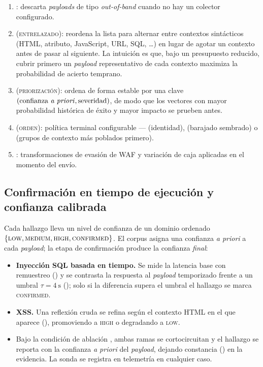 \begin{enumerate}
  \item {}: descarta \emph{payloads} de tipo
  \emph{out-of-band} cuando no hay un colector configurado.
  \item {} (\textsc{entrelazado}): reordena la
  lista para alternar entre contextos sintácticos (HTML, atributo, JavaScript,
  URL, SQL, \dots) en lugar de agotar un contexto antes de pasar al siguiente.
  La intuición es que, bajo un presupuesto reducido, cubrir primero un
  \emph{payload} representativo de cada contexto maximiza la probabilidad de
  acierto temprano.
  \item {} (\textsc{priorización}): ordena de forma estable
  por una clave $(\text{confianza \emph{a priori}}, \text{severidad})$, de
  modo que los vectores con mayor probabilidad histórica de éxito y mayor
  impacto se prueben antes.
  \item {} (\textsc{orden}): política terminal
  configurable ---  (identidad),  (barajado
  sembrado) o  (grupos de contexto más poblados primero).
  \item {}: transformaciones de evasión de WAF
  y variación de caja aplicadas en el momento del envío.
\end{enumerate}

\subsection{Confirmación en tiempo de ejecución y confianza calibrada}
\label{sec:confirmacion}

Cada hallazgo lleva un nivel de confianza de un dominio ordenado
$\{\textsc{low}, \textsc{medium}, \textsc{high}, \textsc{confirmed}\}$. El
corpus asigna una confianza \emph{a priori} a cada \emph{payload}; la etapa de
confirmación produce la confianza \emph{final}:

\begin{itemize}
  \item \textbf{Inyección SQL basada en tiempo.} Se mide la latencia base con
  remuestreo () y se contrasta la respuesta
  al \emph{payload} temporizado frente a un umbral $\tau = \SI{4}{\second}$
  (); solo si la diferencia supera el umbral el
  hallazgo se marca \textsc{confirmed}.
  \item \textbf{XSS.} Una reflexión cruda se refina según el contexto HTML en
  el que aparece (), promoviendo a \textsc{high} o degradando a
  \textsc{low}.
  \item Bajo la condición de ablación , ambas ramas
  se cortocircuitan y el hallazgo se reporta con la confianza \emph{a priori}
  del \emph{payload}, dejando constancia () en la
  evidencia. La sonda se registra en telemetría en cualquier caso.
\end{itemize}

